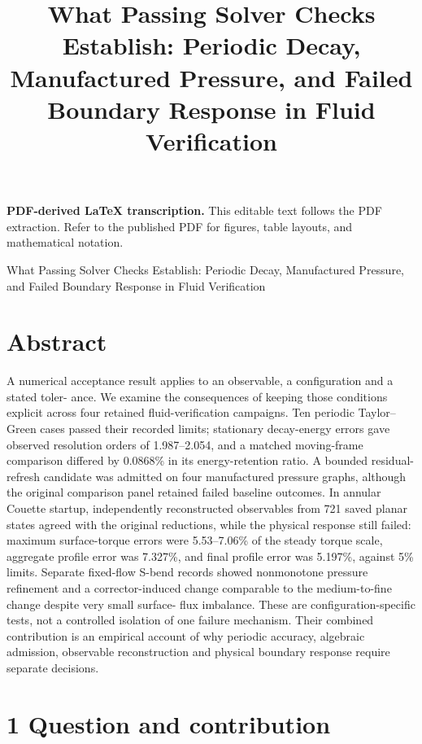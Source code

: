 \documentclass[11pt]{article}
\title{What Passing Solver Checks Establish: Periodic Decay, Manufactured Pressure, and Failed Boundary Response in Fluid Verification}
\author{}
\date{}
\begin{document}
\maketitle
\noindent\textbf{PDF-derived LaTeX transcription.} This editable text follows the PDF extraction. Refer to the published PDF for figures, table layouts, and mathematical notation.


What Passing Solver Checks Establish:
Periodic Decay, Manufactured Pressure,
and Failed Boundary Response in Fluid Verification

\section*{Abstract}

A numerical acceptance result applies to an observable, a configuration and a stated toler-
ance. We examine the consequences of keeping those conditions explicit across four retained
fluid-verification campaigns. Ten periodic Taylor–Green cases passed their recorded limits;
stationary decay-energy errors gave observed resolution orders of 1.987–2.054, and a matched
moving-frame comparison differed by 0.0868\% in its energy-retention ratio. A bounded residual-
refresh candidate was admitted on four manufactured pressure graphs, although the original
comparison panel retained failed baseline outcomes. In annular Couette startup, independently
reconstructed observables from 721 saved planar states agreed with the original reductions, while
the physical response still failed: maximum surface-torque errors were 5.53–7.06\% of the steady
torque scale, aggregate profile error was 7.327\%, and final profile error was 5.197\%, against
5\% limits. Separate fixed-flow S-bend records showed nonmonotone pressure refinement and a
corrector-induced change comparable to the medium-to-fine change despite very small surface-
flux imbalance. These are configuration-specific tests, not a controlled isolation of one failure
mechanism. Their combined contribution is an empirical account of why periodic accuracy,
algebraic admission, observable reconstruction and physical boundary response require separate
decisions.

\section*{1 Question and contribution}
\end{document}
